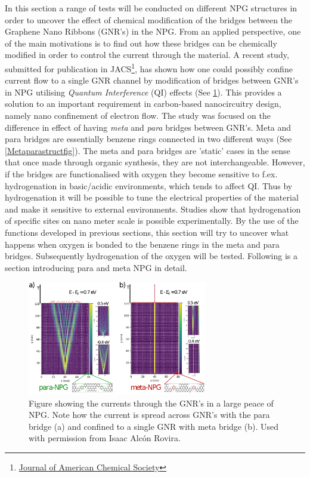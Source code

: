 In this section a range of tests will be conducted on different NPG structures in order to uncover the effect of chemical modification of the bridges between the Graphene Nano Ribbons (GNR's) in the NPG. From an applied perspective, one of the main motivations is to find out how these bridges can be chemically modified in order to control the current through the material. A recent study\cite{unpub}, submitted for publication in JACS\footnote{\href{https://pubs.acs.org/journal/jacsat}{Journal of American Chemical Society}}, has shown how one could possibly confine current flow to a single GNR channel by modification of bridges between GNR's in NPG utilising \textit{Quantum Interference} (QI) effects (See \cref{studyfig3}). This provides a solution to an important requirement in carbon-based nanocircuitry design, namely nano confinement of electron flow. The study was focused on the difference in effect of having \textit{meta} and \textit{para} bridges between GNR's. Meta and para bridges are essentially benzene rings connected in two different ways (See \cref{Metaparastructfig}). The meta and para bridges are 'static' cases in the sense that once made through organic synthesis, they are not interchangeable. However, if the bridges are functionalised with oxygen they become sensitive to f.ex. hydrogenation in basic/acidic environments, which tends to affect QI. Thus by hydrogenation it will be possible to tune the electrical properties of the material and make it sensitive to external environments. Studies\cite{li_single_2019} show that hydrogenation of specific sites on nano meter scale is possible experimentally. By the use of the functions developed in previous sections, this section will try to uncover what happens when oxygen is bonded to the benzene rings in the meta and para bridges. Subsequently hydrogenation of the oxygen will be tested. Following is a section introducing para and meta NPG in detail.
\begin{figure}[h]
	\centering
	\includegraphics[width = 0.7\textwidth]{Figures/Fig_3.eps}
	\caption{Figure showing the currents through the GNR's in a large peace of NPG. Note how the current is spread across GNR's with the para bridge (a) and confined to a single GNR with meta bridge (b). Used with permission from Isaac Alcón Rovira.}
	\label{studyfig3}
\end{figure}
